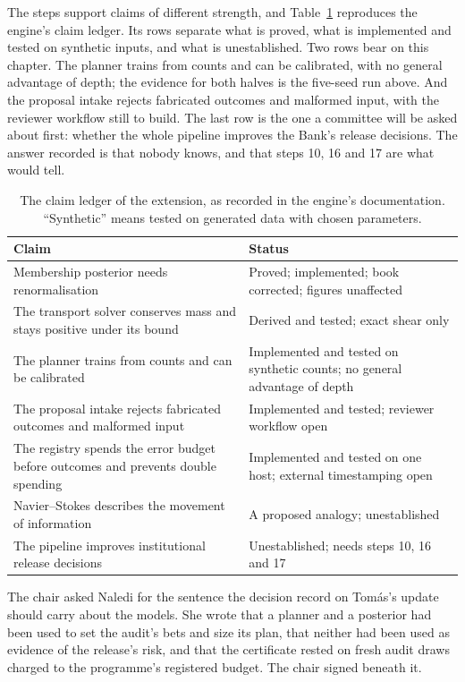 The steps support claims of different strength, and Table~\ref{c22:tab-claims} reproduces the engine's claim ledger.
Its rows separate what is proved, what is implemented and tested on synthetic inputs, and what is
unestablished. Two rows bear on this chapter. The planner trains from counts and can be calibrated,
with no general advantage of depth; the evidence for both halves is the five-seed run above. And the
proposal intake rejects fabricated outcomes and malformed input, with the reviewer workflow still to
build. The last row is the one a committee will be asked about first: whether the whole pipeline
improves the Bank's release decisions. The answer recorded is that nobody knows, and that steps 10,
16 and 17 are what would tell.

\begin{table}[ht]
\centering\small
\begin{tabular}{@{}p{7cm}p{6.2cm}@{}}
\toprule
Claim & Status\\
\midrule
Membership posterior needs renormalisation & Proved; implemented; book corrected; figures unaffected\\
The transport solver conserves mass and stays positive under its bound & Derived and tested; exact shear only\\
The planner trains from counts and can be calibrated & Implemented and tested on synthetic counts; no general advantage of depth\\
The proposal intake rejects fabricated outcomes and malformed input & Implemented and tested; reviewer workflow open\\
The registry spends the error budget before outcomes and prevents double spending & Implemented and tested on one host; external timestamping open\\
Navier--Stokes describes the movement of information & A proposed analogy; unestablished\\
The pipeline improves institutional release decisions & Unestablished; needs steps 10, 16 and 17\\
\bottomrule
\end{tabular}
\caption{The claim ledger of the extension, as recorded in the engine's documentation. ``Synthetic'' means
tested on generated data with chosen parameters.}
\label{c22:tab-claims}
\end{table}

The chair asked Naledi for the sentence the decision record on Tom\'as's update should carry about
the models. She wrote that a planner and a posterior had been used to set the audit's bets and size
its plan, that neither had been used as evidence of the release's risk, and that the certificate
rested on fresh audit draws charged to the programme's registered budget. The chair signed beneath
it.

